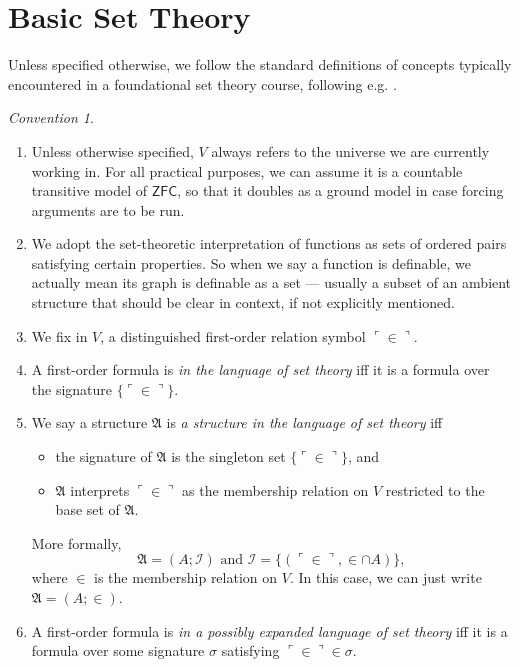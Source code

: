 \documentclass[12pt, twoside]{memoir}
\numberwithin{equation}{section}
\theoremstyle{definition}
\theoremstyle{remark}
\newtheorem{con}[thm]{Convention}
\theoremstyle{definition}
\theoremstyle{definition}
\theoremstyle{definition}
\theoremstyle{remark}
\begin{document}
\section{Basic Set Theory}

Unless specified otherwise, we follow the standard definitions of concepts typically encountered in a foundational set theory course, following e.g. \cite{jechhrbacek}.

\begin{con}
\leavevmode
\begin{enumerate}[label=(\arabic*)]
    \item Unless otherwise specified, $V$ always refers to the universe we are currently working in. For all practical purposes, we can assume it is a countable transitive model of $\mathsf{ZFC}$, so that it doubles as a ground model in case forcing arguments are to be run.
    \item We adopt the set-theoretic interpretation of functions as sets of ordered pairs satisfying certain properties. So when we say a function is definable, we actually mean its graph is definable as a set --- usually a subset of an ambient structure that should be clear in context, if not explicitly mentioned.
    \item We fix in $V$, a distinguished first-order relation symbol $\ulcorner \in \urcorner$.
    \item A first-order formula is \emph{in the language of set theory} iff it is a formula over the signature $\{\ulcorner \in \urcorner\}$.
    \item\label{stcon1} We say a structure $\mathfrak{A}$ is \emph{a structure in the language of set theory} iff 
    \begin{itemize}
        \item the signature of $\mathfrak{A}$ is the singleton set $\{\ulcorner \in \urcorner\}$, and
        \item $\mathfrak{A}$ interprets $\ulcorner \in \urcorner$ as the membership relation on $V$ restricted to the base set of $\mathfrak{A}$.
    \end{itemize}
    More formally, $$\mathfrak{A} = (A; \mathcal{I}) \text{ and } \mathcal{I} = \{(\ulcorner \in \urcorner, \in \cap A)\},$$ where $\in$ is the membership relation on $V$. In this case, we can just write $\mathfrak{A} = (A; \in)$.
    \item A first-order formula is \emph{in a possibly expanded language of set theory} iff it is a formula over some signature $\sigma$ satisfying $\ulcorner \in \urcorner \in \sigma$.

\end{enumerate}
\end{con}
\end{document}
